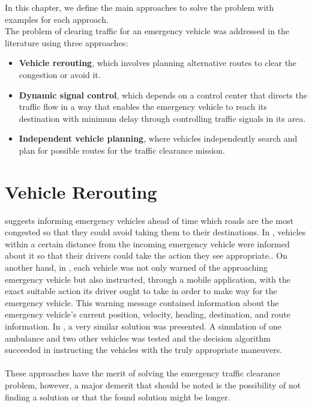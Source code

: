 \label{chapter_lit_review}
In this chapter, we define the main approaches to solve the problem with  examples for each approach.\\

The problem of clearing traffic for an emergency vehicle was addressed in the literature using three approaches:
\begin{itemize}
    \item \textbf{Vehicle rerouting}, which involves planning alternative routes to clear the congestion or avoid it.
    \item \textbf{Dynamic signal control}, which depends on a control center that directs the traffic flow in a way that enables the emergency vehicle to reach its destination with minimum delay through controlling traffic signals in its area. 
    \item \textbf{Independent vehicle planning}, where vehicles independently search and plan for possible routes for the traffic clearance mission.
\end{itemize}
\section{Vehicle Rerouting}
\label{vehicle_rerouting}
\cite{paper1} suggests informing emergency vehicles ahead of time which roads are the most congested so that they could avoid taking them to their destinations. In \cite{paper20}, vehicles within a certain distance from the incoming emergency vehicle were informed about it so that their drivers could take the action they see appropriate.. On another hand, in \cite{paper30}, each vehicle was not only warned of the approaching emergency vehicle but also instructed, through a mobile application, with the exact suitable action its driver ought to take in order to make way for the emergency vehicle. This warning message contained information about the emergency vehicle's current position, velocity, heading, destination, and route information. 
In \cite{paper4}, a very similar solution was presented. A simulation of one ambulance and two other vehicles was tested and the decision algorithm succeeded in instructing the vehicles with the truly appropriate maneuvers.
\\ \\
These approaches have the merit of solving the emergency traffic clearance problem, however, a major demerit that should be noted is the possibility of not finding a solution or that the found solution might be longer.


